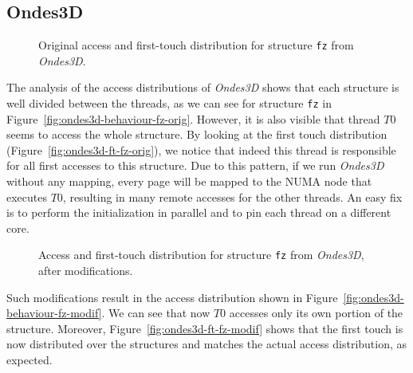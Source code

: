 \subsection{Ondes3D}
\label{sec:exp-ondes3d}

\begin{figure}[!b]
    \centering

    \caption{Original access and first-touch distribution for structure
        \texttt{fz} from \emph{Ondes3D}.}
    \label{fig:ondes3d-orig}
\end{figure}

The analysis of the access distributions of \emph{Ondes3D} shows that each
structure is well divided between the threads, as we can see for structure \texttt{fz} in Figure~\ref{fig:ondes3d-behaviour-fz-orig}.
However, it is also visible that thread $T0$ seems to access the whole structure. By looking at the first touch distribution (Figure~\ref{fig:ondes3d-ft-fz-orig}), we
notice that indeed this thread is responsible for all first accesses to this structure. Due to
this pattern, if we run \emph{Ondes3D} without any mapping, every page
will be mapped to the NUMA node that executes $T0$, resulting in many remote accesses for the other threads. An easy fix is to
perform the initialization in parallel and to pin each thread on a different core.

\begin{figure}[!b]
    \centering

    \caption{Access and first-touch distribution  for structure
        \texttt{fz} from \emph{Ondes3D}, after modifications.}
    \label{fig:ondes3d-modif}
\end{figure}

Such modifications result in the access distribution shown in Figure~\ref{fig:ondes3d-behaviour-fz-modif}. We can see that now $T0$ accesses only
its own portion of the structure. Moreover, Figure~\ref{fig:ondes3d-ft-fz-modif} shows that the first touch is now distributed
over the structures and matches the actual access distribution, as expected.

